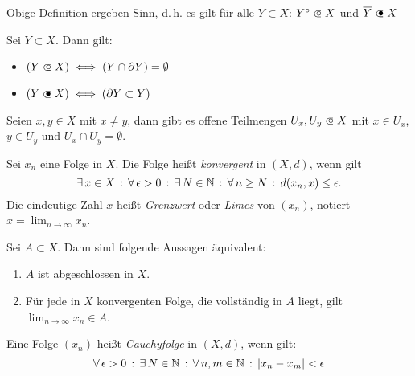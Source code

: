 \documentclass{cheat-sheet}
\begin{document}
\begin{satz}
  Obige Definition ergeben Sinn, d.\,h. es gilt für alle $Y \subset X$: $Y^{\circ} \opn X$ und $\overline{Y} \cls X$
\end{satz}


\begin{satz}
  Sei $Y \subset X$. Dann gilt:
  \begin{multicols}{2}
    \begin{itemize}
      \item $(Y \opn X) \iff (Y \cap \partial Y) = \emptyset$
      \item $(Y \cls X) \iff (\partial Y \subset Y)$
    \end{itemize}
  \end{multicols}
\end{satz}

\begin{satz}
  Seien $x, y \in X$ mit $x \not= y$, dann gibt es offene Teilmengen $U_x, U_y \opn X$ mit $x \in U_x$, $y \in U_y$ und $U_x \cap U_y = \emptyset$.
\end{satz}

\begin{defn}
  Sei $x_n$ eine Folge in $X$. Die Folge heißt \emph{konvergent} in $(X, d)$, wenn gilt
  \[ \exists \, {x \in X} \,:\, \forall \, {\epsilon > 0} \,:\, \exists \, {N \in \mathbb{N}} \,:\, \forall \, {n \ge N} \,:\, d(x_n, x) \le \epsilon. \]
  Die eindeutige Zahl $x$ heißt \emph{Grenzwert} oder \emph{Limes} von $(x_n)$, notiert $x = \lim_{n \to \infty} x_n$.
\end{defn}

\begin{satz}
  Sei $A \subset X$. Dann sind folgende Aussagen äquivalent:
  \begin{enumerate}
    \item $A$ ist abgeschlossen in $X$.
    \item Für jede in $X$ konvergenten Folge, die vollständig in $A$ liegt, gilt $\lim_{n \to \infty} x_n \in A$.
  \end{enumerate}
\end{satz}

\begin{defn}
  Eine Folge $(x_n)$ heißt \emph{Cauchyfolge} in $(X, d)$, wenn gilt:
  \[ \forall \, {\epsilon > 0} \,:\, \exists \, {N \in \mathbb{N}} \,:\, \forall \, {n, m \in \mathbb{N}} \,:\, \lvert x_n - x_m\rvert < \epsilon \]
\end{defn}
\end{document}
